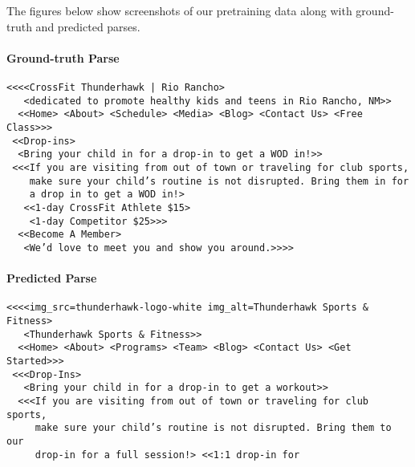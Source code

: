 \documentclass{article} \usepackage[accepted]{icml2023}
\begin{document}
The figures below show screenshots of our pretraining data along with ground-truth and predicted parses.

\begin{figure*}
\small
\centering
{}
\begin{tcolorbox}
\paragraph{Ground-truth Parse}
\begin{verbatim}
<<<<CrossFit Thunderhawk | Rio Rancho>
   <dedicated to promote healthy kids and teens in Rio Rancho, NM>>
  <<Home> <About> <Schedule> <Media> <Blog> <Contact Us> <Free Class>>>
 <<Drop-ins>
  <Bring your child in for a drop-in to get a WOD in!>>
 <<<If you are visiting from out of town or traveling for club sports,
    make sure your child’s routine is not disrupted. Bring them in for
    a drop in to get a WOD in!>
   <<1-day CrossFit Athlete $15>
    <1-day Competitor $25>>>
  <<Become A Member>
   <We’d love to meet you and show you around.>>>>
\end{verbatim}
\end{tcolorbox}
\begin{tcolorbox}
\paragraph{Predicted Parse}
\begin{verbatim}
<<<<img_src=thunderhawk-logo-white img_alt=Thunderhawk Sports & Fitness>
   <Thunderhawk Sports & Fitness>>
  <<Home> <About> <Programs> <Team> <Blog> <Contact Us> <Get Started>>>
 <<<Drop-Ins>
   <Bring your child in for a drop-in to get a workout>>
  <<<If you are visiting from out of town or traveling for club sports,
     make sure your child’s routine is not disrupted. Bring them to our
     drop-in for a full session!> <<1:1 drop-in for
\end{verbatim}
\end{tcolorbox}
\end{figure*}
\end{document}
